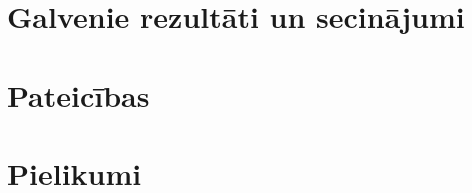 \documentclass[12pt]{report}
\begin{document}
%
%
%
%
%
%
%
%
\setcounter{secnumdepth}{-1}
\chapter{Galvenie rezultāti un secinājumi} \label{chap:Secinajumi}


\chapter{Pateicības} \label{chap:pateicibas}


\nocite{SySML}





\setcounter{secnumdepth}{-1}
\newpage
\begingroup
\renewcommand{\cleardoublepage}{}
\renewcommand{\clearpage}{}
\chapter{Pielikumi}\label{chap:pielikumi}

\endgroup




%
%
%
%
%
\end{document}

